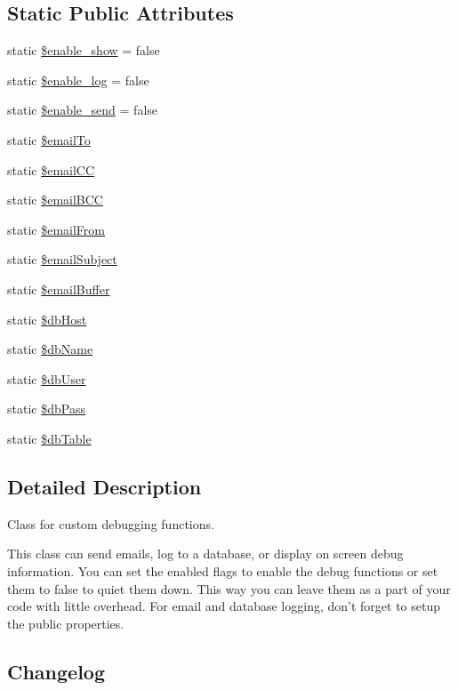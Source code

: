 \subsection*{Static Public Attributes}
\begin{DoxyCompactItemize}
\item 
static \hyperlink{class_debug_a5789d2d16b0d24dc6aa96b63b4f6f605}{\$enable\-\_\-show} = false
\item 
static \hyperlink{class_debug_abf6da1366fe6b13a73e55c0962433b5f}{\$enable\-\_\-log} = false
\item 
static \hyperlink{class_debug_aeb64a58109ab72544114d51e42a3ca4f}{\$enable\-\_\-send} = false
\item 
static \hyperlink{class_debug_a2dca3002fa879522effbe7bd729d681d}{\$email\-To}
\item 
static \hyperlink{class_debug_aef55490ba633a1821bc784c7c5e5a5e5}{\$email\-C\-C}
\item 
static \hyperlink{class_debug_ace2c8fd77a23d56cfdc35a142df1b1ab}{\$email\-B\-C\-C}
\item 
static \hyperlink{class_debug_a8812e953c70aa15f8f01e0a83230e645}{\$email\-From}
\item 
static \hyperlink{class_debug_afc4243e1cc62688011c169b622433f64}{\$email\-Subject}
\item 
static \hyperlink{class_debug_a6da5505f5274a47a70fb0cbac5eef25e}{\$email\-Buffer}
\item 
static \hyperlink{class_debug_ad0ddb2725e69c88a729e0cc242a1b2a6}{\$db\-Host}
\item 
static \hyperlink{class_debug_a68f39949e76b64662a06cb56579d91c3}{\$db\-Name}
\item 
static \hyperlink{class_debug_a4a92606de85aafdc0dcae4976b7ca669}{\$db\-User}
\item 
static \hyperlink{class_debug_a30d808caf55f524798c6a5aaafd633ad}{\$db\-Pass}
\item 
static \hyperlink{class_debug_adfd23e5286c56c7632ecb55887dd2555}{\$db\-Table}
\end{DoxyCompactItemize}


\subsection{Detailed Description}
Class for custom debugging functions.

This class can send emails, log to a database, or display on screen debug information. You can set the enabled flags to enable the debug functions or set them to false to quiet them down. This way you can leave them as a part of your code with little overhead. For email and database logging, don't forget to setup the public properties.\hypertarget{mailer1_changelog}{}\subsection{Changelog}\label{mailer1_changelog}


